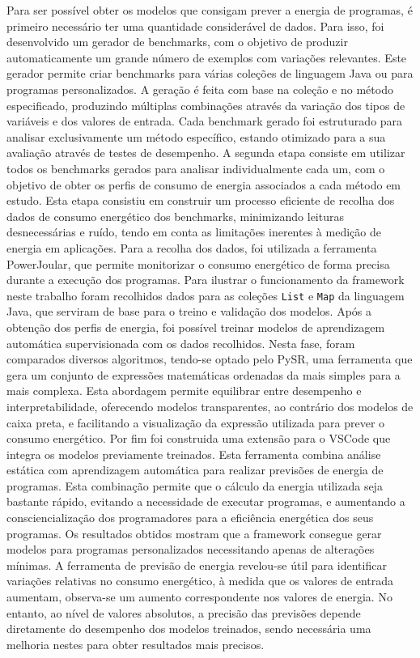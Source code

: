Para ser possível obter os modelos que consigam prever a energia de programas, é primeiro necessário ter uma quantidade considerável de dados. Para isso, foi desenvolvido um gerador de benchmarks, com o objetivo de produzir automaticamente um grande número de exemplos com variações relevantes.
Este gerador permite criar benchmarks para várias coleções de linguagem Java ou para programas personalizados. A geração é feita com base na coleção e no método especificado, produzindo múltiplas combinações através da variação dos tipos de variáveis e dos valores de entrada. Cada benchmark gerado foi estruturado para analisar exclusivamente um método específico, estando otimizado para a sua avaliação através de testes de desempenho.
A segunda etapa consiste em utilizar todos os benchmarks gerados para analisar individualmente cada um, com o objetivo de obter os perfis de consumo de energia associados a cada método em estudo. Esta etapa consistiu em construir um processo eficiente de recolha dos dados de consumo energético dos benchmarks, minimizando leituras desnecessárias e ruído, tendo em conta as limitações inerentes à medição de energia em aplicações. Para a recolha dos dados, foi utilizada a ferramenta PowerJoular, que permite monitorizar o consumo energético de forma precisa durante a execução dos programas.
Para ilustrar o funcionamento da framework neste trabalho foram recolhidos dados para as coleções \texttt{List} e \texttt{Map} da linguagem Java, que serviram de base para o treino e validação dos modelos.
Após a obtenção dos perfis de energia, foi possível treinar modelos de aprendizagem automática supervisionada com os dados recolhidos. Nesta fase, foram comparados diversos algoritmos, tendo-se optado pelo PySR, uma ferramenta que gera um conjunto de expressões matemáticas ordenadas da mais simples para a mais complexa. Esta abordagem permite equilibrar entre desempenho e interpretabilidade, oferecendo modelos transparentes, ao contrário dos modelos de caixa preta, e facilitando a visualização da expressão utilizada para prever o consumo energético.
Por fim foi construida uma extensão para o VSCode que integra os modelos previamente treinados. Esta ferramenta combina análise estática com aprendizagem automática para realizar previsões de energia de programas. Esta combinação permite que o cálculo da energia utilizada seja bastante rápido, evitando a necessidade de executar programas, e aumentando a consciencialização dos programadores para a eficiência energética dos seus programas.
Os resultados obtidos mostram que a framework consegue gerar modelos para programas personalizados necessitando apenas de alterações mínimas. A ferramenta de previsão de energia revelou-se útil para identificar variações relativas no consumo energético, à medida que os valores de entrada aumentam, observa-se um aumento correspondente nos valores de energia. No entanto, ao nível de valores absolutos, a precisão das previsões depende diretamente do desempenho dos modelos treinados, sendo necessária uma melhoria nestes para obter resultados mais precisos.

